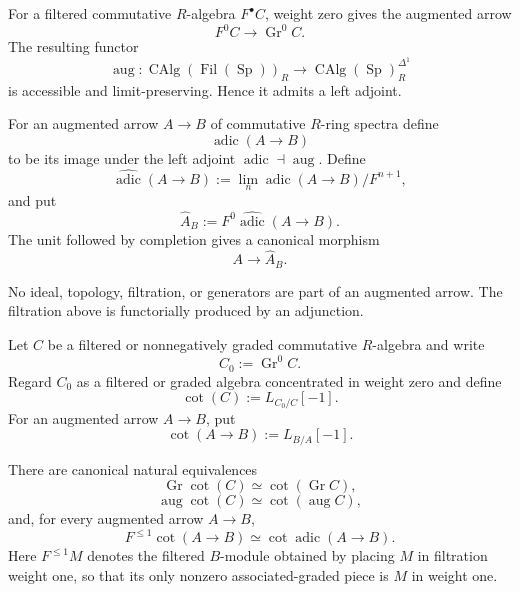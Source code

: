 For a filtered commutative $R$-algebra $F^\bullet C$, weight zero gives the
augmented arrow
\[
    F^0C\longrightarrow\operatorname{Gr}^0C.
\]
The resulting functor
\[
    \operatorname{aug}:
    \operatorname{CAlg}(\operatorname{Fil}(\operatorname{Sp}))_R
    \longrightarrow
    \operatorname{CAlg}(\operatorname{Sp})^{\Delta^1}_R
\]
is accessible and limit-preserving.  Hence it admits a left adjoint.

\begin{definition}
\label{def:bnla-derived-adic-filtration}
For an augmented arrow $A\to B$ of commutative $R$-ring spectra define
\[
    \operatorname{adic}(A\to B)
\]
to be its image under the left adjoint
$\operatorname{adic}\dashv\operatorname{aug}$.  Define
\[
    \widehat{\operatorname{adic}}(A\to B)
    :=
    \lim_n
    \operatorname{adic}(A\to B)/F^{n+1},
\]
and put
\[
    \widehat A_B
    :=F^0\widehat{\operatorname{adic}}(A\to B).
\]
The unit followed by completion gives a canonical morphism
\[
    A\longrightarrow\widehat A_B.
\]
\end{definition}

No ideal, topology, filtration, or generators are part of an augmented arrow.
The filtration above is functorially produced by an adjunction.

\begin{definition}
\label{def:bnla-filtered-graded-cotangent}
Let $C$ be a filtered or nonnegatively graded commutative $R$-algebra and
write
\[
    C_0:=\operatorname{Gr}^0C.
\]
Regard $C_0$ as a filtered or graded algebra concentrated in weight zero and
define
\[
    \operatorname{cot}(C)
    :=
    L_{C_0/C}[-1].
\]
For an augmented arrow $A\to B$, put
\[
    \operatorname{cot}(A\to B)
    :=
    L_{B/A}[-1].
\]
\end{definition}

\begin{lemma}
\label{lem:bnla-adic-cotangent-compatibility}
There are canonical natural equivalences
\[
    \operatorname{Gr}\operatorname{cot}(C)
    \simeq
    \operatorname{cot}(\operatorname{Gr}C),
\]
\[
    \operatorname{aug}\operatorname{cot}(C)
    \simeq
    \operatorname{cot}(\operatorname{aug}C),
\]
and, for every augmented arrow $A\to B$,
\[
    F^{\leq1}\operatorname{cot}(A\to B)
    \simeq
    \operatorname{cot}\operatorname{adic}(A\to B).
\]
Here $F^{\leq1}M$ denotes the filtered $B$-module obtained by placing $M$ in
filtration weight one, so that its only nonzero associated-graded piece is
$M$ in weight one.
\end{lemma}

